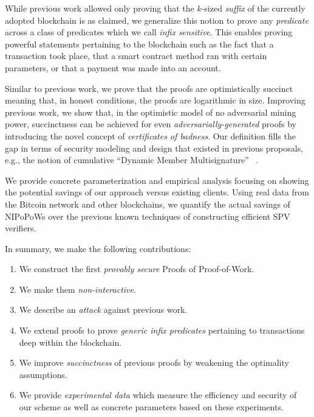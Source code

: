 While previous work allowed only proving that the $k$-sized \emph{suffix} of the
currently adopted blockchain is as claimed, we generalize this notion to prove
any \emph{predicate} across a class of predicates which we call \emph{infix
sensitive}. This enables proving powerful statements pertaining to the
blockchain such as the fact that a transaction took place, that a smart contract
method ran with certain parameters, or that a payment was made into an account.

Similar to previous work, we prove that the proofs are optimistically
succinct meaning that, in honest conditions, the proofs are logarithmic in size.
Improving previous work, we show that, in the optimistic model of no adversarial
mining power, succinctness can be achieved for even
\textit{adversarially-generated} proofs by introducing the novel concept of
\textit{certificates of badness}. Our definition fills the gap in terms of
security modeling and design that existed in previous proposals, e.g., the
notion of cumulative ``Dynamic Member Multisignature'' ~\cite{sidechains}.

We provide concrete parameterization and empirical analysis focusing on showing
the potential savings of our approach versus existing clients. Using real data
from the Bitcoin network and other blockchains, we quantify the actual savings of
NIPoPoWs over the previous known techniques of constructing efficient SPV
verifiers.

In summary, we make the following contributions:
\begin{enumerate}
  \item We construct the first \emph{provably secure} Proofs of Proof-of-Work.
  \item We make them \emph{non-interactive}.
  \item We describe an \emph{attack} against previous work.
  \item We extend proofs to prove \emph{generic infix predicates} pertaining to
        transactions deep within the blockchain.
  \item We improve \emph{succinctness} of previous proofs by weakening the
        optimality assumptions.
  \item We provide \emph{experimental data} which measure the efficiency and
        security of our scheme as well as concrete parameters based on these
        experiments.
\end{enumerate}

